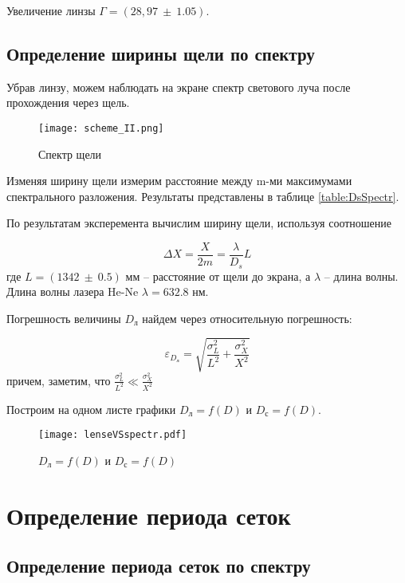 	Увеличение линзы $\Gamma = (28,97 ~ \pm ~ 1.05)$.
    
    \subsection{Определение ширины щели по спектру}
    
    Убрав линзу, можем наблюдать на экране спектр светового луча после прохождения через щель.
    
    \begin{figure}[h!]
    	\centering
    	\texttt{[image: scheme\_II.png]}
    	\caption{Спектр щели}
    \end{figure}

	Изменяя ширину щели измерим расстояние между m-ми максимумами спектрального разложения. Результаты представлены в таблице \ref{table:DsSpectr}.
	
	
	
	По результатам эксперемента вычислим ширину щели, используя соотношение
	
	\begin{equation}
		\Delta X = \frac{X}{2 m} = \frac{\lambda}{D_s} L
	\end{equation}
	где $L = (1342 ~ \pm ~ 0.5)$ мм -- расстояние от щели до экрана, а $\lambda$ -- длина волны. Длина волны лазера He-Ne $\lambda = 632.8$ нм.
	
	Погрешность величины $D_{\text{л}}$ найдем через относительную погрешность:
	
	\[ \varepsilon_{D_{\text{л}}} = \sqrt{\frac{\sigma_L^2}{L^2} + \frac{\sigma_X^2}{X^2}} \]
	причем, заметим, что $\frac{\sigma_L^2}{L^2} \ll \frac{\sigma_X^2}{X^2}$
	
	Построим на одном листе графики $D_{\text{л}} = f(D)$ и $D_{\text{с}} = f(D)$.
	
	\begin{figure}[h!]
		\centering
		\texttt{[image: lenseVSspectr.pdf]}
		\caption{$D_{\text{л}} = f(D)$ и $D_{\text{с}} = f(D)$}
	\end{figure}

    \section{Определение периода сеток}
    \subsection{Определение периода сеток по спектру}
    
